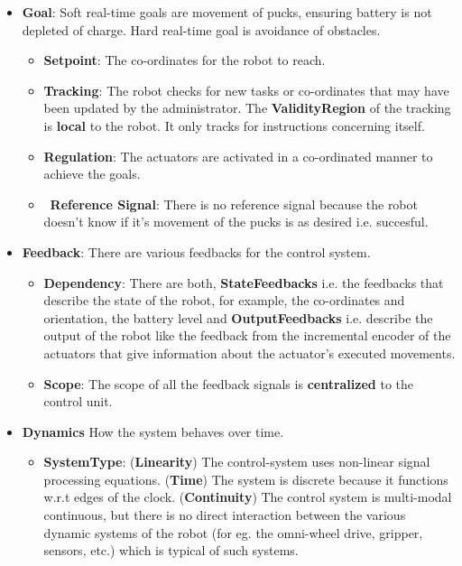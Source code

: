 \begin{itemize}
\begin{itemize}
\begin{itemize}
            \item \checkmark \textbf{Goal}: Soft real-time goals are movement of pucks, ensuring battery is not depleted of charge. Hard real-time goal is avoidance of obstacles.
            \begin{itemize}
                \item \checkmark \textbf{Setpoint}: The co-ordinates for the robot to reach.
                \item \checkmark \textbf{Tracking}: The robot checks for new tasks or co-ordinates that may have been updated by the administrator. The \textbf{ValidityRegion} of the tracking is \textbf{local} to the robot. It only tracks for instructions concerning itself.
                \item \checkmark \textbf{Regulation}: The actuators are activated in a co-ordinated manner to achieve the goals.
                \item \xmark\  \textbf{Reference Signal}: There is no reference signal because the robot doesn't know if it's movement of the pucks is as desired i.e. succesful.
            \end{itemize}
            \item \checkmark \textbf{Feedback}: There are various feedbacks for the control system.
            \begin{itemize}
                \item \checkmark\textbf{Dependency}: There are both, \textbf{StateFeedbacks} i.e. the feedbacks that describe the state of the robot, for example, the co-ordinates and orientation, the battery level and \textbf{OutputFeedbacks} i.e. describe the output of the robot like the feedback from the incremental encoder of the actuators that give information about the actuator's executed movements.
                \item \checkmark\textbf{Scope}: The scope of all the feedback signals is \textbf{centralized} to the control unit.
            \end{itemize}
            \item \checkmark\textbf{Dynamics} How the system behaves over time.
            \begin{itemize}
                \item \checkmark \textbf{SystemType}: (\textbf{Linearity}) The control-system uses non-linear signal processing equations. (\textbf{Time}) The system is discrete because it functions w.r.t edges of the clock. (\textbf{Continuity}) The control system is multi-modal continuous, but there is no direct interaction between the various dynamic systems of the robot (for eg. the omni-wheel drive, gripper, sensors, etc.) which is typical of such systems. 

\end{itemize}
\end{itemize}
\end{itemize}
\end{itemize}

